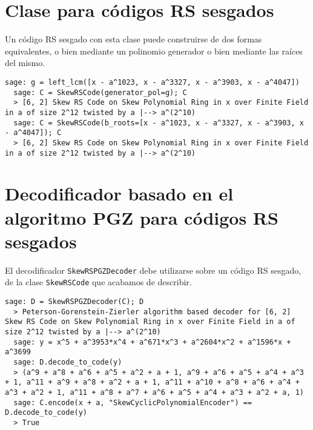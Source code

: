 \section{Clase para códigos RS sesgados}

Un código RS sesgado con esta clase puede construirse de dos formas equivalentes, o bien mediante un polinomio generador o bien mediante las raíces del mismo.

\begin{lstlisting}[gobble=2]
  sage: g = left_lcm([x - a^1023, x - a^3327, x - a^3903, x - a^4047])
  sage: C = SkewRSCode(generator_pol=g); C
  > [6, 2] Skew RS Code on Skew Polynomial Ring in x over Finite Field in a of size 2^12 twisted by a |--> a^(2^10)
  sage: C = SkewRSCode(b_roots=[x - a^1023, x - a^3327, x - a^3903, x - a^4047]); C
  > [6, 2] Skew RS Code on Skew Polynomial Ring in x over Finite Field in a of size 2^12 twisted by a |--> a^(2^10)
\end{lstlisting}

\section{Decodificador basado en el algoritmo PGZ para códigos RS sesgados}

El decodificador \texttt{SkewRSPGZDecoder} debe utilizarse sobre un código RS sesgado, de la clase \texttt{SkewRSCode} que acabamos de describir.

\begin{lstlisting}[gobble=2]
  sage: D = SkewRSPGZDecoder(C); D
  > Peterson-Gorenstein-Zierler algorithm based decoder for [6, 2] Skew RS Code on Skew Polynomial Ring in x over Finite Field in a of size 2^12 twisted by a |--> a^(2^10)
  sage: y = x^5 + a^3953*x^4 + a^671*x^3 + a^2604*x^2 + a^1596*x + a^3699
  sage: D.decode_to_code(y)
  > (a^9 + a^8 + a^6 + a^5 + a^2 + a + 1, a^9 + a^6 + a^5 + a^4 + a^3 + 1, a^11 + a^9 + a^8 + a^2 + a + 1, a^11 + a^10 + a^8 + a^6 + a^4 + a^3 + a^2 + 1, a^11 + a^8 + a^7 + a^6 + a^5 + a^4 + a^3 + a^2 + a, 1)
  sage: C.encode(x + a, "SkewCyclicPolynomialEncoder") == D.decode_to_code(y)
  > True
\end{lstlisting}
